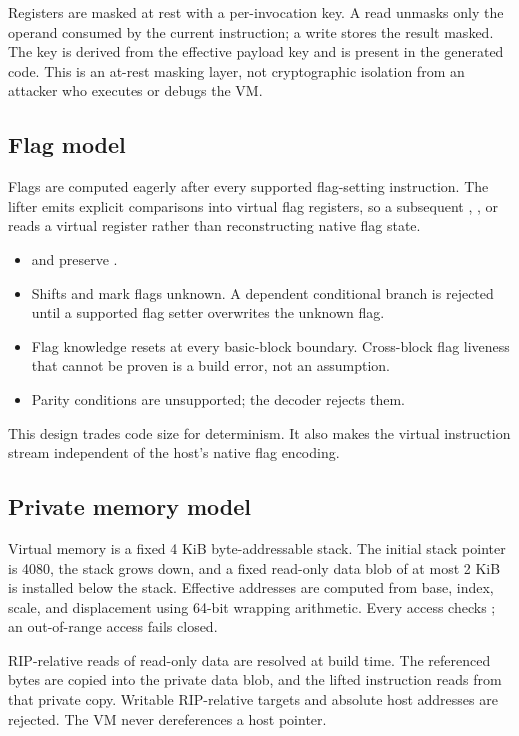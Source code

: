 Registers are masked at rest with a per-invocation key. A read unmasks only the
operand consumed by the current instruction; a write stores the result masked.
The key is derived from the effective payload key and is present in the generated
code. This is an at-rest masking layer, not cryptographic isolation from an
attacker who executes or debugs the VM.

\subsection{Flag model}

Flags are computed eagerly after every supported flag-setting instruction. The
lifter emits explicit comparisons into virtual flag registers, so a subsequent
, , or  reads a virtual register rather than
reconstructing native flag state.

\begin{itemize}
  \item {} and  preserve .
  \item Shifts and  mark flags unknown. A dependent conditional branch
        is rejected until a supported flag setter overwrites the unknown flag.
  \item Flag knowledge resets at every basic-block boundary. Cross-block flag
        liveness that cannot be proven is a build error, not an assumption.
  \item Parity conditions are unsupported; the decoder rejects them.
\end{itemize}

This design trades code size for determinism. It also makes the virtual
instruction stream independent of the host's native flag encoding.

\subsection{Private memory model}

Virtual memory is a fixed 4 KiB byte-addressable stack. The initial stack pointer
is 4080, the stack grows down, and a fixed read-only data blob of at most 2 KiB is
installed below the stack. Effective addresses are computed from base, index,
scale, and displacement using 64-bit wrapping arithmetic. Every access checks
; an out-of-range access fails closed.

RIP-relative reads of read-only data are resolved at build time. The referenced
bytes are copied into the private data blob, and the lifted instruction reads
from that private copy. Writable RIP-relative targets and absolute host addresses
are rejected. The VM never dereferences a host pointer.

